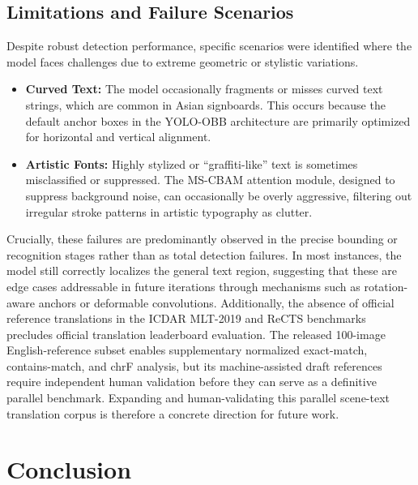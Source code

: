 \documentclass{ieeeaccess}
\begin{document}
{\subsection{Limitations and Failure Scenarios}

Despite robust detection performance, specific scenarios were identified where the model faces challenges due to extreme geometric or stylistic variations.

\begin{itemize}
  \item \textbf{Curved Text:} The model occasionally fragments or misses curved text strings, which are common in Asian signboards. This occurs because the default anchor boxes in the YOLO-OBB architecture are primarily optimized for horizontal and vertical alignment.

  \item \textbf{Artistic Fonts:} Highly stylized or ``graffiti-like'' text is sometimes misclassified or suppressed. The MS-CBAM attention module, designed to suppress background noise, can occasionally be overly aggressive, filtering out irregular stroke patterns in artistic typography as clutter.
\end{itemize}

Crucially, these failures are predominantly observed in the precise bounding or recognition stages rather than as total detection failures. In most instances, the model still correctly localizes the general text region, suggesting that these are edge cases addressable in future iterations through mechanisms such as rotation-aware anchors or deformable convolutions.
Additionally, the absence of official reference translations in the ICDAR MLT-2019 and ReCTS benchmarks precludes official translation leaderboard evaluation. The released 100-image English-reference subset enables supplementary normalized exact-match, contains-match, and chrF analysis, but its machine-assisted draft references require independent human validation before they can serve as a definitive parallel benchmark. Expanding and human-validating this parallel scene-text translation corpus is therefore a concrete direction for future work.

\section{Conclusion}
\label{sec:conclusion}

}
\end{document}
